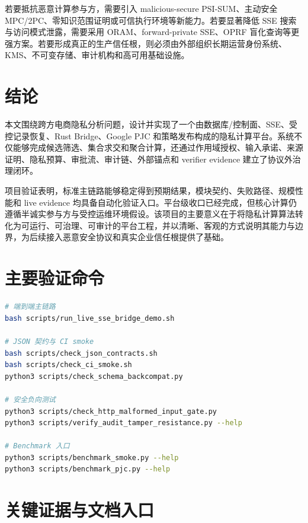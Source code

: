 \documentclass[UTF8,a4paper,12pt,oneside]{ctexrep}
\begin{document}
若要抵抗恶意计算参与方，需要引入 malicious-secure PSI-SUM、主动安全 MPC/2PC、零知识范围证明或可信执行环境等新能力。若要显著降低 SSE 搜索与访问模式泄露，需要采用 ORAM、forward-private SSE、OPRF 盲化查询等更强方案。若要形成真正的生产信任根，则必须由外部组织长期运营身份系统、KMS、不可变存储、审计机构和高可用基础设施。

\chapter{结论}

本文围绕跨方电商隐私分析问题，设计并实现了一个由数据库/控制面、SSE、受控记录恢复、Rust Bridge、Google PJC 和策略发布构成的隐私计算平台。系统不仅能够完成候选筛选、集合求交和聚合计算，还通过作用域授权、输入承诺、来源证明、隐私预算、审批流、审计链、外部锚点和 verifier evidence 建立了协议外治理闭环。

项目验证表明，标准主链路能够稳定得到预期结果，模块契约、失败路径、规模性能和 live evidence 均具备自动化验证入口。平台级收口已经完成，但核心计算仍遵循半诚实参与方与受控运维环境假设。该项目的主要意义在于将隐私计算算法转化为可运行、可治理、可审计的平台工程，并以清晰、客观的方式说明其能力与边界，为后续接入恶意安全协议和真实企业信任根提供了基础。

\appendix

\chapter{主要验证命令}

\begin{lstlisting}[language=bash]
# 端到端主链路
bash scripts/run_live_sse_bridge_demo.sh

# JSON 契约与 CI smoke
bash scripts/check_json_contracts.sh
bash scripts/check_ci_smoke.sh
python3 scripts/check_schema_backcompat.py

# 安全负向测试
python3 scripts/check_http_malformed_input_gate.py
python3 scripts/verify_audit_tamper_resistance.py --help

# Benchmark 入口
python3 scripts/benchmark_smoke.py --help
python3 scripts/benchmark_pjc.py --help
\end{lstlisting}

\chapter{关键证据与文档入口}
\end{document}
